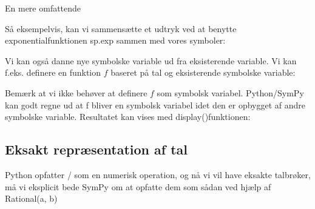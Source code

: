 \documentclass[letterpaper,10pt,english]{jupyterBook}
\begin{document}
En mere omfattende 

Så eksempelvis, kan vi sammensætte et udtryk ved at benytte exponentialfunktionen sp.exp sammen med vores symboler:

\begin{sphinxVerbatim}[commandchars=\\\{\}]
    
\end{sphinxVerbatim}

\noindent{}

Vi kan også danne nye symbolske variable ud fra eksisterende variable. Vi kan f.eks. definere en funktion \(f\) baseret på tal og eksisterende symbolske variable:

\begin{sphinxVerbatim}[commandchars=\\\{\}]
      
\end{sphinxVerbatim}

Bemærk at vi ikke behøver at definere \(f\) som symbolsk variabel. Python/SymPy kan godt regne ud at f bliver en symbolsk variabel idet den er opbygget af andre symbolske variable. Resultatet kan vises med display()\sphinxhyphen{}funktionen:

\begin{sphinxVerbatim}[commandchars=\\\{\}]
\end{sphinxVerbatim}

\noindent{}


\subsection{Eksakt repræsentation af tal}
\label{\detokenize{notebooks/sympy/Notebook2:eksakt-repraesentation-af-tal}}
Python opfatter / som en numerisk operation, og nå vi vil have eksakte tal\sphinxhyphen{}brøker, må vi eksplicit bede SymPy om at opfatte dem som sådan ved hjælp af Rational(a, b)

\begin{sphinxVerbatim}[commandchars=\\\{\}]
   
\end{sphinxVerbatim}
\end{document}
